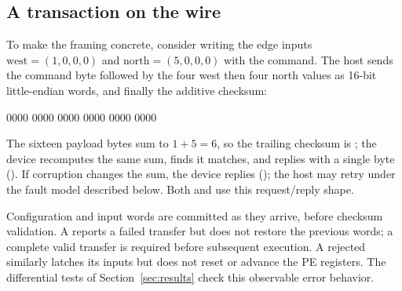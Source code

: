 \subsection{A transaction on the wire}

To make the framing concrete, consider writing the edge inputs
$\text{west}=(1,0,0,0)$ and $\text{north}=(5,0,0,0)$ with the  command.
The host sends the command byte  followed by the four west then four
north values as 16-bit little-endian words, and finally the additive checksum:

\begin{center}\small{} 0000 0000 0000 0000 0000 0000
\end{center}

\noindent The sixteen payload bytes sum to $1+5=6$, so the trailing checksum is
; the device recomputes the same sum, finds it matches, and replies
with a single  byte (). If corruption changes the sum, the
device replies  (); the host may retry under the fault model
described below. Both  and  use this request/reply shape.

Configuration and input words are committed as they arrive, before checksum
validation. A  reports a failed transfer but does not restore the
previous words; a complete valid transfer is required before subsequent
execution. A rejected  similarly latches its inputs but does not
reset or advance the PE registers. The differential tests of
Section~\ref{sec:results} check this observable error behavior.
